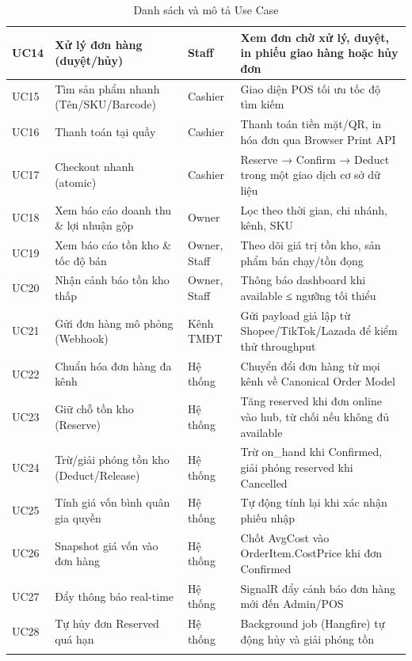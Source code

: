 \begin{longtable}{|p{1.2cm}|p{4.2cm}|p{3.3cm}|p{8.9cm}|}
    \hline
    UC14 & Xử lý đơn hàng (duyệt/hủy) & Staff & Xem đơn chờ xử lý, duyệt, in phiếu giao hàng hoặc hủy đơn \\
    \hline
    UC15 & Tìm sản phẩm nhanh (Tên/SKU/Barcode) & Cashier & Giao diện POS tối ưu tốc độ tìm kiếm \\
    \hline
    UC16 & Thanh toán tại quầy & Cashier & Thanh toán tiền mặt/QR, in hóa đơn qua Browser Print API \\
    \hline
    UC17 & Checkout nhanh (atomic) & Cashier & Reserve → Confirm → Deduct trong một giao dịch cơ sở dữ liệu \\
    \hline
    UC18 & Xem báo cáo doanh thu \& lợi nhuận gộp & Owner & Lọc theo thời gian, chi nhánh, kênh, SKU \\
    \hline
    UC19 & Xem báo cáo tồn kho \& tốc độ bán & Owner, Staff & Theo dõi giá trị tồn kho, sản phẩm bán chạy/tồn đọng \\
    \hline
    UC20 & Nhận cảnh báo tồn kho thấp & Owner, Staff & Thông báo dashboard khi available ≤ ngưỡng tối thiểu \\
    \hline
    UC21 & Gửi đơn hàng mô phỏng (Webhook) & Kênh TMĐT & Gửi payload giả lập từ Shopee/TikTok/Lazada để kiểm thử throughput \\
    \hline
    UC22 & Chuẩn hóa đơn hàng đa kênh & Hệ thống & Chuyển đổi đơn hàng từ mọi kênh về Canonical Order Model \\
    \hline
    UC23 & Giữ chỗ tồn kho (Reserve) & Hệ thống & Tăng reserved khi đơn online vào hub, từ chối nếu không đủ available \\
    \hline
    UC24 & Trừ/giải phóng tồn kho (Deduct/Release) & Hệ thống & Trừ on\_hand khi Confirmed, giải phóng reserved khi Cancelled \\
    \hline
    UC25 & Tính giá vốn bình quân gia quyền & Hệ thống & Tự động tính lại khi xác nhận phiếu nhập \\
    \hline
    UC26 & Snapshot giá vốn vào đơn hàng & Hệ thống & Chốt AvgCost vào OrderItem.CostPrice khi đơn Confirmed \\
    \hline
    UC27 & Đẩy thông báo real-time & Hệ thống & SignalR đẩy cảnh báo đơn hàng mới đến Admin/POS \\
    \hline
    UC28 & Tự hủy đơn Reserved quá hạn & Hệ thống & Background job (Hangfire) tự động hủy và giải phóng tồn \\
    \hline
    \caption{Danh sách và mô tả Use Case}
    \label{tab:usecases}
\end{longtable}
